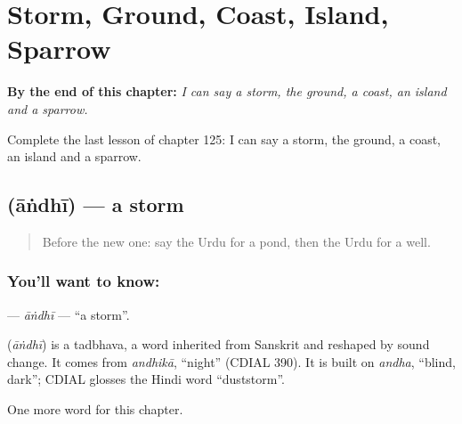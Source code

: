 
\chapter{Storm, Ground, Coast, Island, Sparrow}
\label{ch:ur-storm-ground-coast-island-sparrow}

\begin{chapteropening}
\textbf{By the end of this chapter:} \emph{I can say a storm, the ground, a coast, an island and a sparrow.}

Complete the last lesson of chapter 125: I can say a storm, the ground, a coast, an island and a sparrow.
\end{chapteropening}

\section[\texorpdfstring{\ur{آندھی} (āṅdhī)}{آندھی (āṅdhī)}]{ (āṅdhī) — a storm}

\label{lesson:UR-C125-andhi}



\begin{quote}
Before the new one: say the Urdu for a pond, then the Urdu for a well.
\end{quote}

\subsection*{You'll want to know: }
\textbf{} — \emph{āṅdhī} — \textquotedblleft{}a storm\textquotedblright{}.

\begin{cousinweb}
\textbf{} (\emph{āṅdhī}) is a tadbhava, a word inherited from Sanskrit and reshaped by sound change. It comes from \emph{andhikā}, \textquotedblleft{}night\textquotedblright{} (CDIAL 390). It is built on \emph{andha}, \textquotedblleft{}blind, dark\textquotedblright{}; CDIAL glosses the Hindi word \textquotedblleft{}duststorm\textquotedblright{}.
\end{cousinweb}

\begin{grammarlens}[title={What you've built}]
One more word for this chapter.
\end{grammarlens}

